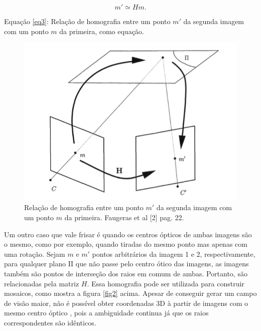 \begin{equation}\label{eq3}
m' \simeq Hm.
\end{equation}

Equação \eqref{eq3}: Relação de homografia entre um ponto $m'$ da segunda imagem com um ponto $m$ da primeira, como equação.

\begin{figure}
	\centering
		\includegraphics{Imagens/figura2-1.png}
	\caption{Relação de homografia entre um ponto $m'$ da segunda imagem com um ponto $m$ da primeira. Faugeras et al [2] pag. 22.}
	\label{fig1}
\end{figure}

Um outro caso que vale frisar é quando os centros ópticos de ambas imagens são o mesmo, como por exemplo, quando tiradas do mesmo ponto mas apenas com uma rotação. Sejam $m$ e $m'$ pontos arbitrários da imagem 1 e 2, respectivamente, para qualquer plano II que não passe pelo centro ótico das imagens, as imagens também são pontos de interseção dos raios em comum de ambas. Portanto, são relacionadas pela matriz $H$. Essa homografia pode ser utilizada para construir mosaicos, como mostra a figura \ref{fig2} acima. Apesar de conseguir gerar um campo de visão maior, não é possível obter coordenadas 3D à partir de imagens com o mesmo centro óptico \cite{Faugeras-Geometry}, pois a ambiguidade continua já que os raios correspondentes são idênticos.

